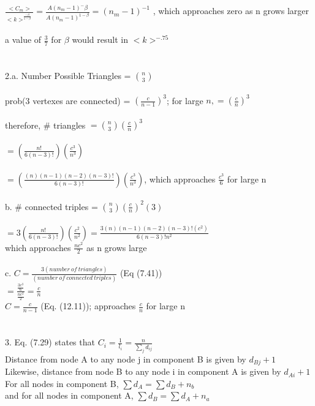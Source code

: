 \documentclass[11pt, oneside]{article}   	%
\begin{document}
\indent $\frac {<C_m>} {<k>^\frac{-\beta}{1-\beta}} = \frac{A(n_m-1)^-\beta}{A(n_m-1)^{1-\beta}} = (n_m-1)^{-1}$ , which approaches zero as n grows larger\\\\
\indent a value of $\frac{3}{7}$ for $\beta$ would result in $<k>^{-.75}$\\
\\
\\
2.a.  Number Possible Triangles =  $\binom{n}{3}$\\\\
\indent prob(3 vertexes are connected) = $(\frac{c}{n-1})^3$; for large $n,  = (\frac{c}{n})^3$\\\\
\indent therefore, \# triangles $= \binom{n}{3}(\frac{c}{n})^3$\\\\
\indent $ = (\frac{n!}{6(n-3)!})(\frac{c^3}{n^3})$\\\\
\indent $ = (\frac{(n)(n-1)(n-2)(n-3)!}{6(n-3)!})( \frac{c^3}{n^3})$, which approaches  $\frac {c^3}{6}$ for large n\\\\
b.  \# connected triples = $\binom{n}{3} (\frac{c}{n})^2(3)$\\\\
\indent $ = 3(\frac{n!}{6(n-3)!})(\frac{c^2}{n^2}) = \frac{3(n)(n-1)(n-2)(n-3)!(c^2)}{6(n-3)!n^2}$\\
\indent which approaches $\frac{nc^2}{2}$ as n grows large\\\\
c.  $C = \frac{3(number\ of\ triangles)}{(number\ of\ connected\ triples)}$ (Eq (7.41))\\
\indent $ = \frac {\frac{3c^3}{6}}{\frac{nc^2}{2}} = \frac{c}{n}$\\
\indent $C = \frac{c}{n-1}$ (Eq. (12.11)); approaches $\frac{c}{n}$ for large n\\\\\\
3.  Eq. (7.29) states that $C_i = \frac{1}{l_i} = \frac{n}{\sum_{j}d_{ij}}$\\
\indent Distance from node A to any node j in component B is given by $d_{Bj} + 1$\\
\indent Likewise, distance from node B to any node i in component A  is given by $d_{Ai} + 1$\\
\indent For all nodes in component B, $\sum d_A = \sum d_B+n_b$\\
\indent and for all nodes in component A, $\sum d_B = \sum d_A+n_a$\\
\end{document}
